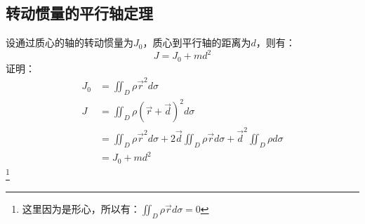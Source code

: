 \documentclass{ctexart}
\begin{document}
\subsection{转动惯量的平行轴定理}
设通过质心的轴的转动惯量为$J_0$，质心到平行轴的距离为$d$，则有：
$$
    J = J_0 + md^2
$$
证明：\\
\begin{align*}
    J_0 & = \iint_{D} \rho \vec{r}^2 d \sigma                                                                                                                   \\
    J   & = \iint_{D} \rho (\vec{r} + \vec{d})^2 d \sigma                                                                                            \\
        & = \iint_{D} \rho \vec{r}^2 d \sigma + 2 \vec{d} \iint_{D} \rho \vec{r} d \sigma + \vec{d}^2 \iint_{D} \rho  d \sigma \\
        & = J_0 + m d^2
\end{align*}
\footnote{这里因为是形心，所以有：$\iint_{D} \rho \vec{r} d \sigma = 0$}
\end{document}
